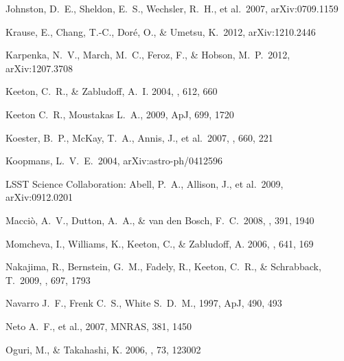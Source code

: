 \begin{thebibliography}{99}
 Johnston, D.~E., 
Sheldon, E.~S., Wechsler, R.~H., et al.\ 2007, arXiv:0709.1159 

 Krause, E., Chang, 
T.-C., Dor{\'e}, O., \& Umetsu, K.\ 2012, arXiv:1210.2446 

 Karpenka, N.~V., 
March, M.~C., Feroz, F., \& Hobson, M.~P.\ 2012, arXiv:1207.3708 

{Keeton}, C.~R., \& {Zabludoff}, A.~I. 2004, \apj, 612, 660

 Keeton C.~R., Moustakas L.~A., 2009, ApJ, 699, 1720 


 Koester, B.~P., McKay, 
T.~A., Annis, J., et al.\ 2007, \apj, 660, 221 

 Koopmans, L.~V.~E.\ 2004, 
arXiv:astro-ph/0412596 

 LSST 
Science Collaboration: Abell, P.~A., Allison, J., et al.\ 2009, 
arXiv:0912.0201 

 Macci{\`o}, A.~V., 
Dutton, A.~A., \& van den Bosch, F.~C.\ 2008, \mnras, 391, 1940 



{Momcheva}, I., {Williams}, K., {Keeton}, C., \& {Zabludoff}, A. 2006, \apj,
  641, 169

 Nakajima, R., 
Bernstein, G.~M., Fadely, R., Keeton, C.~R., 
\& Schrabback, T.\ 2009, \apj, 697, 1793 

 Navarro J.~F., Frenk C.~S., White S.~D.~M., 1997, ApJ, 490, 493 


Neto A.~F., et al., 2007, MNRAS, 381, 1450 


{Oguri}, M., \& {Takahashi}, K. 2006, \prd, 73, 123002


\end{thebibliography}
